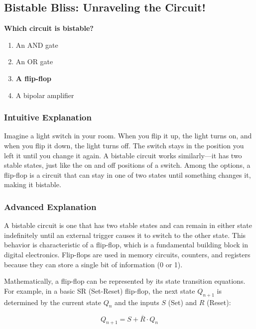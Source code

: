 \subsection{Bistable Bliss: Unraveling the Circuit!}

\begin{tcolorbox}[colback=gray!10!white,colframe=black!75!black,title=\textbf{E7A01}]
\textbf{Which circuit is bistable?}
\begin{enumerate}[label=\Alph*,noitemsep]
    \item An AND gate
    \item An OR gate
    \item \textbf{A flip-flop}
    \item A bipolar amplifier
\end{enumerate}
\end{tcolorbox}

\subsubsection{Intuitive Explanation}
Imagine a light switch in your room. When you flip it up, the light turns on, and when you flip it down, the light turns off. The switch stays in the position you left it until you change it again. A bistable circuit works similarly—it has two stable states, just like the on and off positions of a switch. Among the options, a flip-flop is a circuit that can stay in one of two states until something changes it, making it bistable.

\subsubsection{Advanced Explanation}
A bistable circuit is one that has two stable states and can remain in either state indefinitely until an external trigger causes it to switch to the other state. This behavior is characteristic of a flip-flop, which is a fundamental building block in digital electronics. Flip-flops are used in memory circuits, counters, and registers because they can store a single bit of information (0 or 1).

Mathematically, a flip-flop can be represented by its state transition equations. For example, in a basic SR (Set-Reset) flip-flop, the next state \( Q_{n+1} \) is determined by the current state \( Q_n \) and the inputs \( S \) (Set) and \( R \) (Reset):

\[
Q_{n+1} = S + \overline{R} \cdot Q_n
\]

